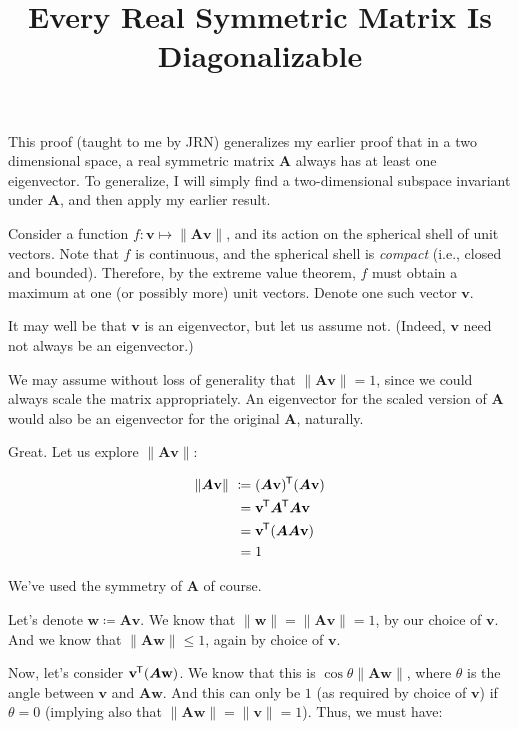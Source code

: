 \documentclass[11pt, oneside]{amsart}
\title{Every Real Symmetric Matrix Is Diagonalizable}
\newcommand{\define}[1]{\textit{#1}}
\newcommand{\mtx}[1]{\bm{#1}}
\newcommand{\norm}[1]{\lVert #1 \rVert}
\newcommand*{\tran}{^{\mkern-1.5mu\mathsf{T}}}
\renewcommand{\vec}[1]{\mathbf{#1}}
\newcommand{\mtxA}{\mtx{A}}
\newcommand{\vecv}{\vec{v}}
\newcommand{\vecw}{\vec{w}}
\begin{document}
\maketitle

This proof (taught to me by JRN) generalizes my earlier proof that in
a two dimensional space, a real symmetric matrix $\mtxA$ always has at
least one eigenvector. To generalize, I will simply find a
two-dimensional subspace invariant under $\mtxA$, and then apply my
earlier result.

Consider a function $f : \vecv \mapsto \norm{\mtxA\vecv}$, and its
action on the spherical shell of unit vectors. Note that $f$ is
continuous, and the spherical shell is \define{compact} (i.e., closed
and bounded). Therefore, by the extreme value theorem, $f$ must obtain
a maximum at one (or possibly more) unit vectors. Denote one such
vector $\vecv$.

It may well be that $\vecv$ is an eigenvector, but let us assume
not. (Indeed, $\vecv$ need not always be an eigenvector.)

We may assume without loss of generality that $\norm{\mtxA\vecv} =
1$, since we could always scale the matrix appropriately. An
eigenvector for the scaled version of $\mtxA$ would also be an
eigenvector for the original $\mtxA$, naturally.

Great. Let us explore $\norm{\mtxA\vecv}$:

\begin{equation*}
  \begin{split}
    \norm{\mtxA\vecv}
    \
    \coloneqq{}& (\mtxA\vecv)\tran (\mtxA\vecv)
    \\
    ={}& \vecv\tran \mtxA\tran \mtxA \vecv
    \\
    ={}& \vecv\tran (\mtxA\mtxA\vecv)
    \\
    ={}& 1
  \end{split}
\end{equation*}

We've used the symmetry of $\mtxA$ of course.

Let's denote $\vecw \coloneqq \mtxA\vecv$. We know that $\norm{\vecw}
= \norm{\mtxA\vecv} = 1$, by our choice of $\vecv$. And we know that
$\norm{\mtxA \vecw} \le 1$, again by choice of $\vecv$.

Now, let's consider $\vecv\tran (\mtxA\vecw)$. We know that this is
$\cos{\theta} \norm{\mtxA\vecw}$, where $\theta$ is the angle between
$\vecv$ and $\mtxA\vecw$. And this can only be $1$ (as required by
choice of $\vecv$) if $\theta = 0$ (implying also that
$\norm{\mtxA\vecw} = \norm{\vecv} = 1$). Thus, we must have:
\end{document}
